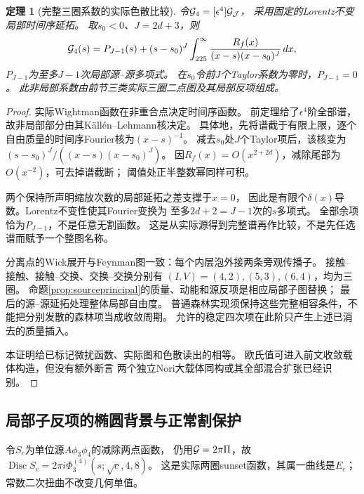 \documentclass[11pt,a4paper]{ctexart}
\theoremstyle{cnplain}\newtheorem{theorem}{定理}[section]
\theoremstyle{definition}\newtheorem{definition}[theorem]{定义}
\theoremstyle{remark}\newtheorem{remark}[theorem]{注}
\begin{document}
\begin{theorem}[完整三圈系数的实际色散比较]\label{thm:sourcefullcorrelator}
令$ {\cal G}_4=[\epsilon^4]{\cal G}_{\cal J}$，
采用固定的Lorentz不变局部时间序延拓。
取$s_0<0$、$J=2d+3$，则
\begin{equation}\label{eq:sourcefullG}
 {\cal G}_4(s)=P_{J-1}(s)+(s-s_0)^J
 \int_{225}^{\infty}\frac{R_f(x)}{(x-s)(x-s_0)^J}\,dx ,
\end{equation}
$P_{J-1}$为至多$J-1$次局部源--源多项式。
在$s_0$令前$J$个Taylor系数为零时，$P_{J-1}=0$。
此非局部系数由前节三类实际三圈二点图及其局部反项组成。
\end{theorem}
\begin{proof}
实际Wightman函数在非重合点决定时间序函数。
前定理给了$\epsilon^4$阶全部谱，故非局部部分由其Källén--Lehmann核决定。
具体地，先将谱截于有限上限，逐个自由质量的时间序Fourier核为$(x-s)^{-1}$。
减去$s_0$处$J$个Taylor项后，该核变为
$(s-s_0)^J/((x-s)(x-s_0)^J)$。
因$R_f(x)=O(x^{2+2d})$，减除尾部为$O(x^{-2})$，可去掉谱截断；
阈值处正半整数幂同样可积。

两个保持所声明缩放次数的局部延拓之差支撑于$x=0$，
因此是有限个$\delta(x)$导数。Lorentz不变性使其Fourier变换为
至多$2d+2=J-1$次的$s$多项式。
全部余项恰为$P_{J-1}$，不是任意无割函数。
这是从实际源得到完整谱再作比较，不是先任选谱而赋予一个整图名称。

分离点的Wick展开与Feynman图一致：每个内层泡外接两条旁观传播子。
接触--接触、接触--交换、交换--交换分别有
$(I,V)=(4,2),(5,3),(6,4)$，均为三圈。
命题\ref{prop:sourceprincipal}的质量、动能和源反项是相应局部子图替换；
最后的源--源延拓处理整体局部自由度。
普通森林实现须保持这些完整相容条件，不能把分别发散的森林项当成收敛周期。
允许的稳定四次项在此阶只产生上述已消去的质量插入。

本证明给已标记微扰函数、实际图和色散读出的相等。
欧氏值可进入前文收敛载体构造，但没有额外断言
两个独立Nori大载体同构或其全部混合扩张已经识别。
\end{proof}

\subsection{局部子反项的椭圆背景与正常割保护}
令$S_c$为单位源$A\phi_3\phi_4$的减除两点函数，
仍用$ {\cal G}=2\pi\Pi$，故
$\operatorname{Disc}S_c=2\pi i\Phi_3^{(4)}(s;\sqrt c,4,8)$。
这是实际两圈sunset函数，其属一曲线是$E_c$；
常数二次扭曲不改变几何单值。
\end{document}
